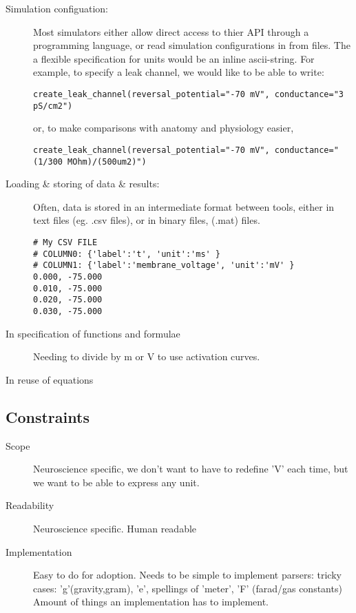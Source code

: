 \documentclass{article}
\begin{document}
\begin{description}
\item[Simulation configuation:]
Most simulators either allow direct access to thier API through a programming language, or read simulation configurations in from files. The a flexible specification for units would be an inline ascii-string.  For example, to specify a leak channel, we would like to be able to write:
\begin{lstlisting}
create_leak_channel(reversal_potential="-70 mV", conductance="3 pS/cm2")
\end{lstlisting}
or, to make comparisons with anatomy and physiology easier,
\begin{lstlisting}
create_leak_channel(reversal_potential="-70 mV", conductance="(1/300 MOhm)/(500um2)")
\end{lstlisting}


\item[Loading \& storing of data \& results:] 


Often, data is stored in an intermediate format between tools, either in text files (eg. .csv files), or in binary files, (.mat) files. 

\begin{verbatim}
# My CSV FILE
# COLUMN0: {'label':'t', 'unit':'ms' }
# COLUMN1: {'label':'membrane_voltage', 'unit':'mV' }
0.000, -75.000
0.010, -75.000
0.020, -75.000
0.030, -75.000
\end{verbatim}


\item[In specification of functions and formulae]
Needing to divide by m or V to use activation curves.

\item[In reuse of equations]


\end{description}



\subsection{Constraints}
\begin{description}
\item[Scope] Neuroscience specific, we don't want to have to redefine 'V' each time, but we want to be able to express any unit.
\item[Readability] Neuroscience specific. Human readable 
\item[Implementation] Easy to do for adoption. Needs to be simple to implement parsers: tricky cases: 'g'(gravity,gram), 'e', spellings of 'meter', 'F' (farad/gas constants)
Amount of things an implementation has to implement.
\end{description}
\end{document}
